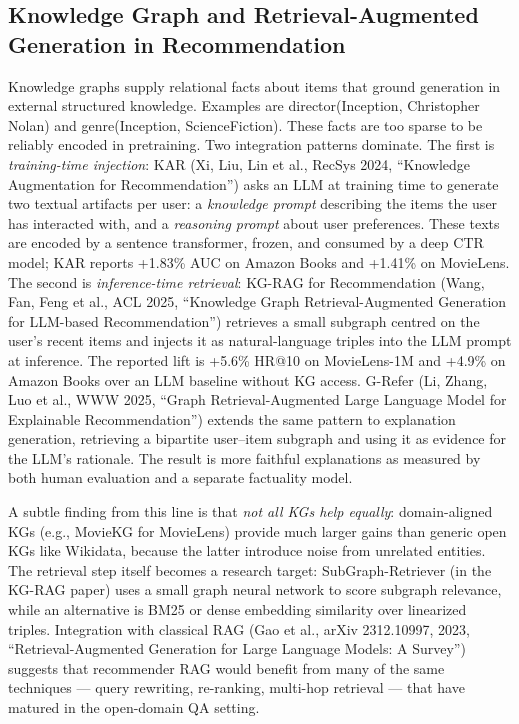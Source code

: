 \documentclass{article}
\begin{document}
\subsection{Knowledge Graph and Retrieval-Augmented Generation in Recommendation}\label{knowledge-graph-and-retrieval-augmented-generation-in-recommendation}

Knowledge graphs supply relational facts about items that ground generation in external structured knowledge. Examples are director(Inception, Christopher Nolan) and genre(Inception, ScienceFiction). These facts are too sparse to be reliably encoded in pretraining. Two integration patterns dominate. The first is \emph{training-time injection}: KAR (Xi, Liu, Lin et al., RecSys 2024, ``Knowledge Augmentation for Recommendation'') asks an LLM at training time to generate two textual artifacts per user: a \emph{knowledge prompt} describing the items the user has interacted with, and a \emph{reasoning prompt} about user preferences. These texts are encoded by a sentence transformer, frozen, and consumed by a deep CTR model; KAR reports +1.83\% AUC on Amazon Books and +1.41\% on MovieLens. The second is \emph{inference-time retrieval}: KG-RAG for Recommendation (Wang, Fan, Feng et al., ACL 2025, ``Knowledge Graph Retrieval-Augmented Generation for LLM-based Recommendation'') retrieves a small subgraph centred on the user's recent items and injects it as natural-language triples into the LLM prompt at inference. The reported lift is +5.6\% HR@10 on MovieLens-1M and +4.9\% on Amazon Books over an LLM baseline without KG access. G-Refer (Li, Zhang, Luo et al., WWW 2025, ``Graph Retrieval-Augmented Large Language Model for Explainable Recommendation'') extends the same pattern to explanation generation, retrieving a bipartite user--item subgraph and using it as evidence for the LLM's rationale. The result is more faithful explanations as measured by both human evaluation and a separate factuality model.

A subtle finding from this line is that \emph{not all KGs help equally}: domain-aligned KGs (e.g., MovieKG for MovieLens) provide much larger gains than generic open KGs like Wikidata, because the latter introduce noise from unrelated entities. The retrieval step itself becomes a research target: SubGraph-Retriever (in the KG-RAG paper) uses a small graph neural network to score subgraph relevance, while an alternative is BM25 or dense embedding similarity over linearized triples. Integration with classical RAG (Gao et al., arXiv 2312.10997, 2023, ``Retrieval-Augmented Generation for Large Language Models: A Survey'') suggests that recommender RAG would benefit from many of the same techniques --- query rewriting, re-ranking, multi-hop retrieval --- that have matured in the open-domain QA setting.
\end{document}
